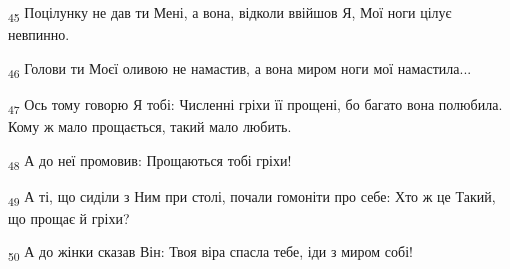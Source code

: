 \begin{tcolorbox}
\textsubscript{45} Поцілунку не дав ти Мені, а вона, відколи ввійшов Я, Мої ноги цілує невпинно.
\end{tcolorbox}
\begin{tcolorbox}
\textsubscript{46} Голови ти Моєї оливою не намастив, а вона миром ноги мої намастила...
\end{tcolorbox}
\begin{tcolorbox}
\textsubscript{47} Ось тому говорю Я тобі: Численні гріхи її прощені, бо багато вона полюбила. Кому ж мало прощається, такий мало любить.
\end{tcolorbox}
\begin{tcolorbox}
\textsubscript{48} А до неї промовив: Прощаються тобі гріхи!
\end{tcolorbox}
\begin{tcolorbox}
\textsubscript{49} А ті, що сиділи з Ним при столі, почали гомоніти про себе: Хто ж це Такий, що прощає й гріхи?
\end{tcolorbox}
\begin{tcolorbox}
\textsubscript{50} А до жінки сказав Він: Твоя віра спасла тебе, іди з миром собі!
\end{tcolorbox}

